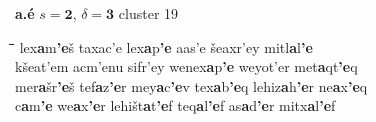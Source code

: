\begin{figure}[htb]
\begin{mdframed}
\vspace{2pt}
{\textbf{a.\'{e}}} \hfill {$s = \mathbf{2}$, $\delta = \mathbf{3}$} \hfill { cluster 19}
\vspace{3pt}
\begin{normalsize}
\begin{tabbing}
\hspace*{15ex}\= \hspace*{16ex}\=\hspace*{16ex}\=\hspace*{16ex}\=\hspace*{16ex}\=\hspace*{13ex} \kill
lex\textbf{a}m\textbf{\a'{e}}\v{s} \> taxac\a'{e} \> lex\textbf{a}p\textbf{\a'{e}} \> aas\a'{e} \> \v{s}eaxr\a'{e}y \> mitl\textbf{a}l\textbf{\a'{e}} \\
k\v{s}eat\a'{e}m \> acm\a'{e}nu \> sifr\a'{e}y \> wenex\textbf{a}p\textbf{\a'{e}} \> weyot\a'{e}r \> met\textbf{a}qt\textbf{\a'{e}}q \\
mer\textbf{a}\v{s}r\textbf{\a'{e}}\v{s} \> tef\textbf{a}z\textbf{\a'{e}}r \> mey\textbf{a}c\textbf{\a'{e}}v \> tex\textbf{a}b\textbf{\a'{e}}q \> lehiz\textbf{a}h\textbf{\a'{e}}r \> ne\textbf{a}x\textbf{\a'{e}}q \\
c\textbf{a}m\textbf{\a'{e}} \> we\textbf{a}x\textbf{\a'{e}}r \> lehi\v{s}t\textbf{a}t\textbf{\a'{e}}f \> teq\textbf{a}l\textbf{\a'{e}}f \> as\textbf{a}d\textbf{\a'{e}}r \> mitx\textbf{a}l\textbf{\a'{e}}f \\

\end{tabbing}
\end{normalsize}
\end{mdframed}
\end{figure}
